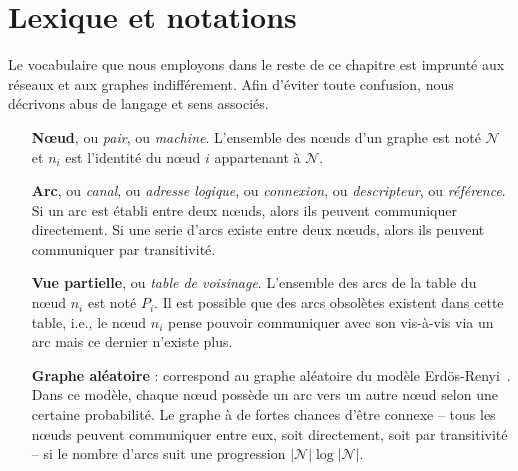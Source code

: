 
\section{Lexique et notations}
\label{net:sec:lexique}

Le vocabulaire que nous employons dans le reste de ce chapitre est imprunté aux
réseaux et aux graphes indifférement. Afin d'éviter toute confusion, nous
décrivons abus de langage et sens associés.

\begin{itemize}
\item [\textbf{Nœud},] ou \emph{pair}, ou \emph{machine}. L'ensemble des nœuds
  d'un graphe est noté $\mathcal{N}$ et $n_i$ est l'identité du nœud $i$
  appartenant à $\mathcal{N}$.
\item [\textbf{Arc},] ou \emph{canal}, ou \emph{adresse logique}, ou
  \emph{connexion}, ou \emph{descripteur}, ou \emph{référence}. Si un arc est
  établi entre deux nœuds, alors ils peuvent communiquer directement. Si une
  serie d'arcs existe entre deux nœuds, alors ils peuvent communiquer par
  transitivité.
\item [\textbf{Vue partielle},] ou \emph{table de voisinage}. L'ensemble des
  arcs de la table du nœud $n_i$ est noté $P_i$. Il est possible que des arcs
  obsolètes existent dans cette table, i.e., le nœud $n_i$ pense pouvoir
  communiquer avec son vis-à-vis via un arc mais ce dernier n'existe plus.
\item [\textbf{Graphe aléatoire} :] correspond au graphe aléatoire du modèle
  Erdös-Renyi~\cite{erdos1959random}. Dans ce modèle, chaque nœud possède un
  arc vers un autre nœud selon une certaine probabilité. Le graphe à de fortes
  chances d'être connexe -- tous les nœuds peuvent communiquer entre eux, soit
  directement, soit par transitivité -- si le nombre d'arcs suit une progression
  $|\mathcal{N}|\log |\mathcal{N}|$.
\end{itemize}

